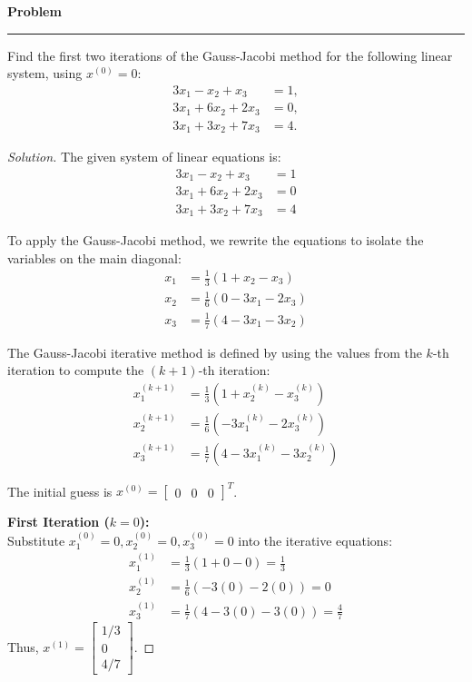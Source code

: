 \documentclass[11pt, a4paper]{article}
\newenvironment{problem}{%
  \begin{tcolorbox}[
    colback=blue!4!white,
    colframe=blue!38!black,
    boxrule=0.95pt,
    arc=3pt,
    left=11pt,
    right=11pt,
    top=10pt,
    bottom=11pt,
    before skip=12pt,
    after skip=14pt,
  ]
  \noindent\textbf{\textcolor{blue!35!black}{Problem}}\par\nointerlineskip
  {\color{blue!42!black}\rule{\linewidth}{0.55pt}}\par\vspace{0.55em}%
}{%
  \end{tcolorbox}%
}
\newif\ifsolutionnewpage
\newenvironment{solution}
  {\begin{proof}[Solution]}
  {\end{proof}\ifsolutionnewpage\newpage\fi}
\begin{document}
\begin{problem}
    Find the first two iterations of the Gauss-Jacobi method for the following linear system, using $x^{(0)}=0$:
    \begin{align*}
        3x_{1}-x_{2}+x_{3} &= 1, \\
        3x_{1}+6x_{2}+2x_{3} &= 0, \\
        3x_{1}+3x_{2}+7x_{3} &= 4.
    \end{align*}
\end{problem}

\begin{solution}
    The given system of linear equations is:
    \begin{align*}
        3x_{1} - x_{2} + x_{3} &= 1 \\
        3x_{1} + 6x_{2} + 2x_{3} &= 0 \\
        3x_{1} + 3x_{2} + 7x_{3} &= 4
    \end{align*}

    To apply the Gauss-Jacobi method, we rewrite the equations to isolate the variables on the main diagonal:
    \begin{align*}
        x_{1} &= \frac{1}{3} \left( 1 + x_{2} - x_{3} \right) \\
        x_{2} &= \frac{1}{6} \left( 0 - 3x_{1} - 2x_{3} \right) \\
        x_{3} &= \frac{1}{7} \left( 4 - 3x_{1} - 3x_{2} \right)
    \end{align*}

    The Gauss-Jacobi iterative method is defined by using the values from the $k$-th iteration to compute the $(k+1)$-th iteration:
    \begin{align*}
        x_{1}^{(k+1)} &= \frac{1}{3} \left( 1 + x_{2}^{(k)} - x_{3}^{(k)} \right) \\
        x_{2}^{(k+1)} &= \frac{1}{6} \left( -3x_{1}^{(k)} - 2x_{3}^{(k)} \right) \\
        x_{3}^{(k+1)} &= \frac{1}{7} \left( 4 - 3x_{1}^{(k)} - 3x_{2}^{(k)} \right)
    \end{align*}

    The initial guess is $x^{(0)} = \begin{bmatrix} 0 & 0 & 0 \end{bmatrix}^T$.

    \textbf{First Iteration ($k=0$):} \\
    Substitute $x_1^{(0)} = 0, x_2^{(0)} = 0, x_3^{(0)} = 0$ into the iterative equations:
    \begin{align*}
        x_{1}^{(1)} &= \frac{1}{3} \left( 1 + 0 - 0 \right) = \frac{1}{3} \\[1ex]
        x_{2}^{(1)} &= \frac{1}{6} \left( -3(0) - 2(0) \right) = 0 \\[1ex]
        x_{3}^{(1)} &= \frac{1}{7} \left( 4 - 3(0) - 3(0) \right) = \frac{4}{7}
    \end{align*}
    Thus, $x^{(1)} = \begin{bmatrix} 1/3 \\ 0 \\ 4/7 \end{bmatrix}$.


\end{solution}
\end{document}
